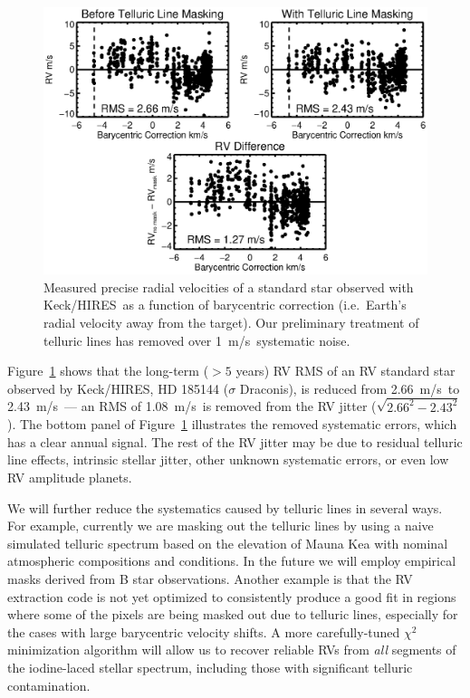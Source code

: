 \documentclass[12pt]{article}
\def\mps{m/s}
\def\keck{Keck/HIRES}
\begin{document}
\begin{figure}[thb]
  \vspace{-5pt}
  \begin{center}
    \includegraphics[scale=0.6]{telluric}
  \end{center}
  \vspace{-25pt}  
  \caption{Measured precise radial velocities of a standard star
    observed with \keck\ as a function of barycentric correction
    (i.e.~Earth's radial velocity away from the target). Our
    preliminary treatment of telluric lines has removed over
    1~\mps\ systematic noise.}
  \vspace{-8pt}  
  \label{fig:tell}
\end{figure}

Figure~\ref{fig:tell} shows that the long-term ($> 5$ years) RV RMS of
an RV standard star observed by \keck, HD 185144 ($\sigma$ Draconis),
is reduced from 2.66~\mps\ to 2.43~\mps\ --- an RMS of 1.08~\mps\ is
removed from the RV jitter ($\sqrt{2.66^2-2.43^2}$). The bottom panel
of Figure~\ref{fig:tell} illustrates the removed systematic errors,
which has a clear annual signal. The rest of the RV jitter may be due
to residual telluric line effects, intrinsic stellar jitter, other
unknown systematic errors, or even low RV amplitude planets.

We will further reduce the systematics caused by telluric lines in
several ways. For example, currently we are masking out the telluric
lines by using a naive simulated telluric spectrum based on the
elevation of Mauna Kea with nominal atmospheric compositions and
conditions. In the future we will employ empirical masks derived from
B star observations. Another example is that the RV extraction code is
not yet optimized to consistently produce a good fit in regions where
some of the pixels are being masked out due to telluric lines,
especially for the cases with large barycentric velocity shifts. A
more carefully-tuned $\chi^2$ minimization algorithm will allow us to
recover reliable RVs from \textit{all} segments of the iodine-laced
stellar spectrum, including those with significant telluric
contamination.
\end{document}
